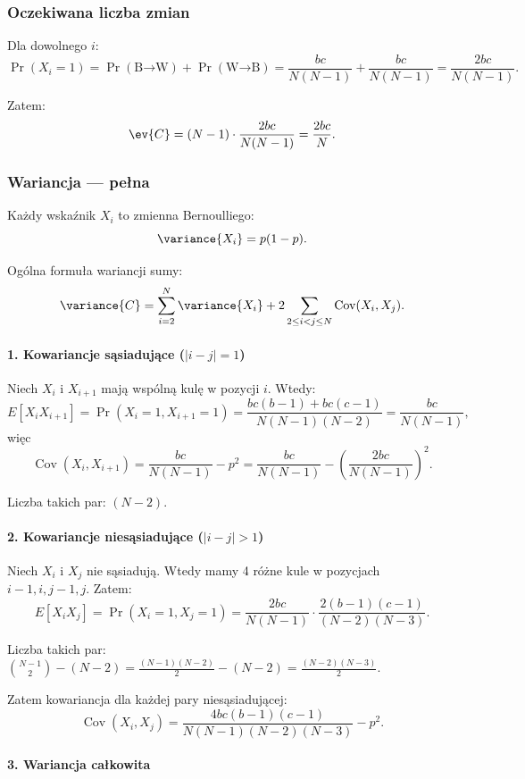 \subsubsection*{Oczekiwana liczba zmian}

Dla dowolnego \(i\):
\[
	\Pr(X_i=1) = \Pr(\text{B→W}) + \Pr(\text{W→B}) = \frac{b c}{N(N-1)} + \frac{b c}{N(N-1)} = \frac{2 b c}{N(N-1)}.
\]

Zatem:
\[
	\ev{C} = (N-1) \cdot \frac{2 b c}{N(N-1)} = \frac{2 b c}{N}.
\]

\subsubsection*{Wariancja — pełna}

Każdy wskaźnik \(X_i\) to zmienna Bernoulliego:
\[
	\variance{X_i} = p(1-p).
\]

Ogólna formuła wariancji sumy:
\[
	\variance{C} = \sum_{i=2}^N \variance{X_i} + 2 \sum_{2 \le i < j \le N} \operatorname{Cov}(X_i, X_j).
\]

\paragraph{1. Kowariancje sąsiadujące (\(|i-j|=1\))}

Niech \(X_i\) i \(X_{i+1}\) mają wspólną kulę w pozycji \(i\). Wtedy:
\[ E[X_iX_{i+1}] =
	\Pr(X_i=1, X_{i+1}=1) = \frac{b c (b-1) + b c (c-1)}{N(N-1)(N-2)} = \frac{bc}{N(N-1)},
\]
więc
\[
	\operatorname{Cov}(X_i,X_{i+1}) = \frac{bc}{N(N-1)} - p^2 = \frac{bc}{N(N-1)} - \left(\frac{2bc}{N(N-1)}\right)^2.
\]

Liczba takich par: \((N-2)\).

\paragraph{2. Kowariancje niesąsiadujące (\(|i-j|>1\))}

Niech \(X_i\) i \(X_j\) nie sąsiadują. Wtedy mamy 4 różne kule w pozycjach \(i-1,i,j-1,j\). Zatem:
\[ E[X_iX_{j}] =
	\Pr(X_i=1, X_j=1) = \frac{2bc}{N(N-1)} \cdot \frac{2(b-1)(c-1)}{(N-2)(N-3)}.
\]

Liczba takich par: \(\binom{N-1}{2} - (N-2) = \frac{(N-1)(N-2)}{2} - (N-2) = \frac{(N-2)(N-3)}{2}.\)

Zatem kowariancja dla każdej pary niesąsiadującej:
\[
	\operatorname{Cov}(X_i,X_j) = \frac{4bc(b-1)(c-1)}{N(N-1)(N-2)(N-3)} - p^2.
\]

\paragraph{3. Wariancja całkowita}

